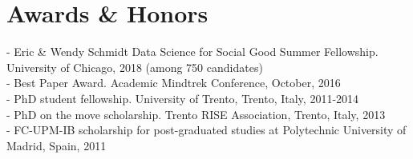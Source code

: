 
\section{Awards \& Honors}

- Eric \& Wendy Schmidt Data Science for Social Good Summer Fellowship. University of Chicago, 2018 (among 750 candidates)\\
- Best Paper Award. Academic Mindtrek Conference, October, 2016\\
- PhD student fellowship. University of Trento, Trento, Italy, 2011-2014\\
- PhD on the move scholarship. Trento RISE Association, Trento, Italy, 2013\\
- FC-UPM-IB scholarship for post-graduated studies at Polytechnic University of Madrid, Spain, 2011
